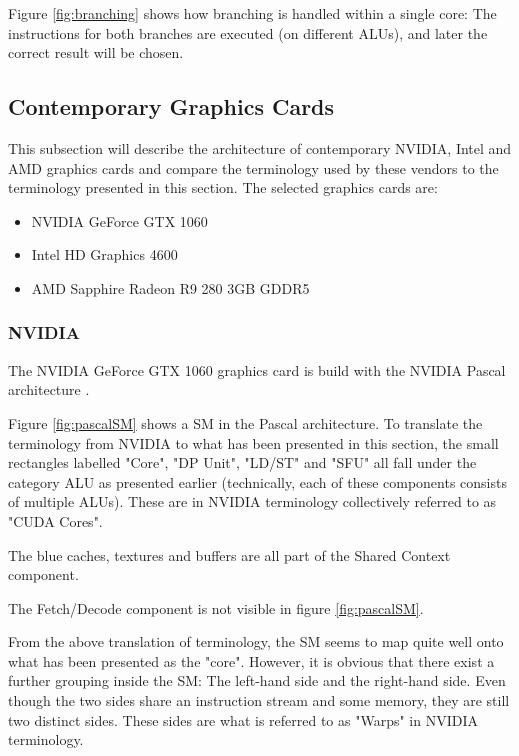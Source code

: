 Figure \ref{fig:branching} shows how branching is handled within a single core: The instructions for both branches are executed (on different \glspl{ALU}), and later the correct result will be chosen.
 
\subsection{Contemporary Graphics Cards}
This subsection will describe the architecture of  contemporary NVIDIA, Intel and AMD graphics cards and compare the terminology used by these vendors to the terminology presented in this section.
The selected graphics cards are:
\begin{itemize}
	\item NVIDIA GeForce GTX 1060
	\item Intel HD Graphics 4600
	\item AMD Sapphire Radeon R9 280 3GB GDDR5
\end{itemize}

\subsubsection{NVIDIA}
The NVIDIA GeForce GTX 1060 graphics card is build with the NVIDIA Pascal architecture \cite{nvidia_gtx_1060}.


Figure \ref{fig:pascalSM} shows a \gls{SM} in the Pascal architecture.
To translate the terminology from NVIDIA to what has been presented in this section, the small rectangles labelled "Core", "DP Unit", "LD/ST" and "SFU" all fall under the category \gls{ALU} as presented earlier (technically, each of these components consists of multiple \glspl{ALU}).
These are in NVIDIA terminology collectively referred to as "CUDA Cores".

The blue caches, textures and buffers are all part of the Shared Context component.

The Fetch/Decode component is not visible in figure \ref{fig:pascalSM}.

From the above translation of terminology, the \gls{SM} seems to map quite well onto what has been presented as the "core".
However, it is obvious that there exist a further grouping inside the \gls{SM}: The left-hand side and the right-hand side.
Even though the two sides share an instruction stream and some memory, they are still two distinct sides.
These sides are what is referred to as "Warps" in NVIDIA terminology.

